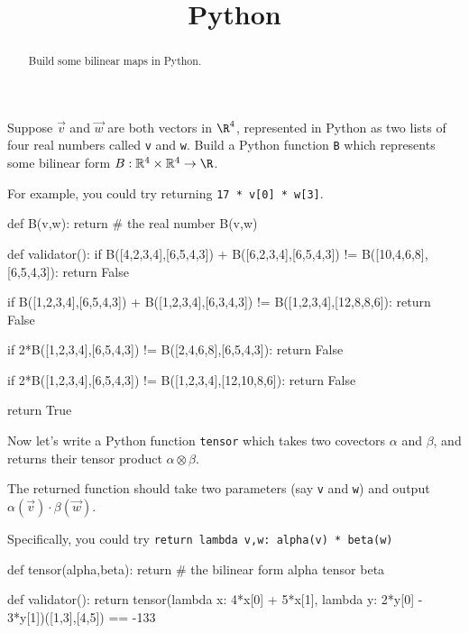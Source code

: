 \documentclass{ximera}
\title{Python}
\begin{document}
\begin{abstract}
  Build some bilinear maps in Python.
\end{abstract}	

\begin{question}
  Suppose $\vec{v}$ and $\vec{w}$ are both vectors in $\R^4$, represented in Python as two lists of four real numbers called \texttt{v} and \texttt{w}.  Build a Python function \texttt{B} which represents some bilinear form $B : \mathbb{R}^4 \times \mathbb{R}^4 \to \R$.

  \begin{solution}
    \begin{hint}
      For example, you could try returning \texttt{17 * v[0] * w[3]}.
    \end{hint}
    \begin{python}
def B(v,w):
  return # the real number B(v,w)

def validator():
  if B([4,2,3,4],[6,5,4,3]) + B([6,2,3,4],[6,5,4,3]) != B([10,4,6,8],[6,5,4,3]):
    return False

  if B([1,2,3,4],[6,5,4,3]) + B([1,2,3,4],[6,3,4,3]) != B([1,2,3,4],[12,8,8,6]):
    return False

  if 2*B([1,2,3,4],[6,5,4,3]) != B([2,4,6,8],[6,5,4,3]):
    return False

  if 2*B([1,2,3,4],[6,5,4,3]) != B([1,2,3,4],[12,10,8,6]):
    return False

  return True
    \end{python}
  \end{solution}

Now let's write a Python function \texttt{tensor} which takes two covectors $\alpha$ and $\beta$, and returns their tensor product $\alpha \otimes \beta$.  

  \begin{solution}
    \begin{hint}
      The returned function should take two parameters (say \texttt{v} and \texttt{w}) and output $\alpha(\vec{v}) \cdot \beta(\vec{w})$.
    \end{hint}
    \begin{hint}
      Specifically, you could try \texttt{return lambda v,w: alpha(v) * beta(w)}
    \end{hint}
    \begin{python}
def tensor(alpha,beta):
  return # the bilinear form alpha tensor beta

def validator():
  return tensor(lambda x: 4*x[0] + 5*x[1], lambda y: 2*y[0] - 3*y[1])([1,3],[4,5]) == -133
    \end{python}
  \end{solution}

\end{question}
\end{document}
